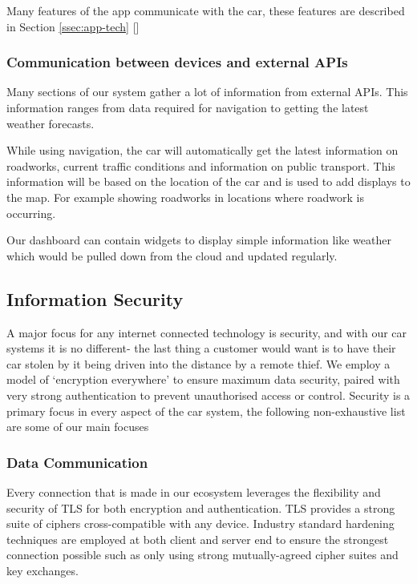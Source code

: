 \documentclass{article}
\begin{document}
Many features of the app communicate with the car, these features are described in Section \ref{ssec:app-tech} []

\subsubsection{Communication between devices and external APIs} \label{sssec:devices-APIs}
Many sections of our system gather a lot of information from external APIs. This information ranges from data required for navigation to getting the latest weather forecasts.

While using navigation, the car will automatically get the latest information on roadworks, current traffic conditions and information on public transport. This information will be based on the location of the car and is used to add displays to the map. For example showing roadworks in locations where roadwork is occurring.

Our dashboard can contain widgets to display simple information like weather which would be pulled down from the cloud and updated regularly.

\subsection{Information Security}\label{ssec:information-security} %
A major focus for any internet connected technology is security, and with our car systems it is no different- the last thing a customer would want is to have their car stolen by it being driven into the distance by a remote thief. We employ a model of `encryption everywhere' to ensure maximum data security, paired with very strong authentication to prevent unauthorised access or control. Security is a primary focus in every aspect of the car system, the following non-exhaustive list are some of our main focuses

\subsubsection{Data Communication}
Every connection that is made in our ecosystem leverages the flexibility and security of TLS for both encryption and authentication. TLS provides a strong suite of ciphers cross-compatible with any device. Industry standard hardening techniques are employed at both client and server end to ensure the strongest connection possible such as only using strong mutually-agreed cipher suites and key exchanges.
\end{document}
